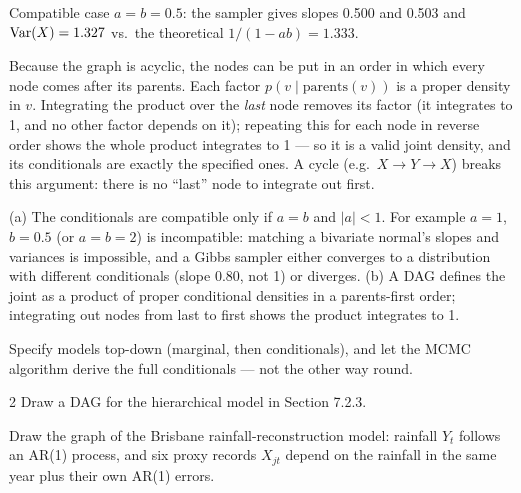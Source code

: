 \documentclass[11pt]{article}
\begin{document}
\begin{sanity}
Compatible case $a=b=0.5$: the sampler gives slopes 0.500 and 0.503 and $\mathrm{Var}(X)=1.327$ vs.\ the theoretical $1/(1-ab)=1.333$. \checkmark
\end{sanity}

 Because the graph is acyclic, the nodes can be put in an order in which every node comes after its parents. Each factor $p(v\mid\text{parents}(v))$ is a proper density in $v$. Integrating the product over the \emph{last} node removes its factor (it integrates to 1, and no other factor depends on it); repeating this for each node in reverse order shows the whole product integrates to 1 --- so it is a valid joint density, and its conditionals are exactly the specified ones. A cycle (e.g.\ $X\to Y\to X$) breaks this argument: there is no ``last'' node to integrate out first.

\begin{answer}
(a) The conditionals are compatible only if $a=b$ and $|a|<1$. For example $a=1$, $b=0.5$ (or $a=b=2$) is incompatible: matching a bivariate normal's slopes and variances is impossible, and a Gibbs sampler either converges to a distribution with different conditionals (slope 0.80, not 1) or diverges. (b) A DAG defines the joint as a product of proper conditional densities in a parents-first order; integrating out nodes from last to first shows the product integrates to 1.
\end{answer}

\begin{takeaway}
Specify models top-down (marginal, then conditionals), and let the MCMC algorithm derive the full conditionals --- not the other way round.
\end{takeaway}


\begin{problem}{2}
Draw a DAG for the hierarchical model in Section 7.2.3.
\end{problem}

\begin{restate}
Draw the graph of the Brisbane rainfall-reconstruction model: rainfall $Y_t$ follows an AR(1) process, and six proxy records $X_{jt}$ depend on the rainfall in the same year plus their own AR(1) errors.
\end{restate}
\end{document}
